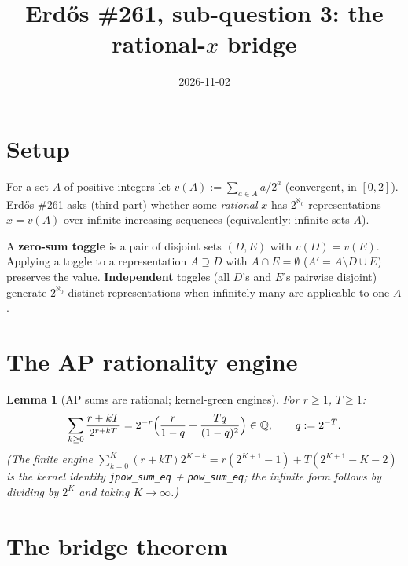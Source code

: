 \documentclass{article}
\newtheorem{lemma}[theorem]{Lemma}
\begin{document}
\title{Erd\H{o}s \#261, sub-question 3: the rational-$x$ bridge}
\date{2026-11-02}
\maketitle

\section{Setup}

For a set $A$ of positive integers let $v(A) := \sum_{a \in A} a/2^a$
(convergent, in $[0,2]$).  Erd\H{o}s \#261 asks (third part) whether some
\emph{rational} $x$ has $2^{\aleph_0}$ representations $x = v(A)$ over
infinite increasing sequences (equivalently: infinite sets $A$).

A \textbf{zero-sum toggle} is a pair of disjoint sets $(D, E)$ with
$v(D) = v(E)$.  Applying a toggle to a representation $A \supseteq D$ with
$A \cap E = \emptyset$ ($A' = A \setminus D \cup E$) preserves the value.
\textbf{Independent} toggles (all $D$'s and $E$'s pairwise disjoint) generate
$2^{\aleph_0}$ distinct representations when infinitely many are applicable
to one $A$.

\section{The AP rationality engine}

\begin{lemma}[AP sums are rational; kernel-green engines]\label{lem:ap}
For $r \ge 1$, $T \ge 1$:
\[ \sum_{k \ge 0} \frac{r + kT}{2^{r+kT}}
   = 2^{-r}\Bigl( \frac{r}{1 - q} + \frac{Tq}{(1-q)^2} \Bigr) \in
     \mathbb{Q}, \qquad q := 2^{-T}. \]
(The finite engine $\sum_{k=0}^{K}(r+kT)2^{K-k} = r(2^{K+1}-1) +
T(2^{K+1}-K-2)$ is the kernel identity \texttt{jpow\_sum\_eq} +
\texttt{pow\_sum\_eq}; the infinite form follows by dividing by $2^K$ and
taking $K \to \infty$.)
\end{lemma}

\section{The bridge theorem}
\end{document}
